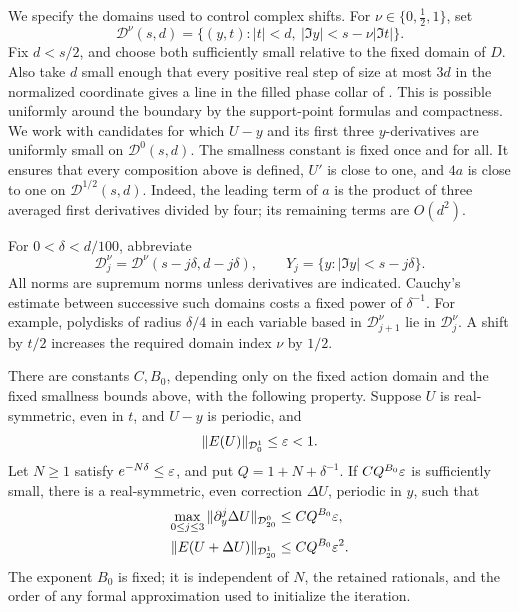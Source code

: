 We specify the domains used to control complex shifts. For
\(\nu\in\{0,\tfrac12,1\}\), set
\begin{equation}
 \mathcal D^\nu(s,d)
 =\{(y,t):|t|<d,\ |\Im y|<s-\nu|\Im t|\}.
 \label{joint:slanted-domains}
\end{equation}
Fix \(d<s/2\), and choose both sufficiently small relative to the fixed
domain of \(D\). Also take \(d\) small enough that every positive real
step of size at most \(3d\) in the normalized coordinate gives a line
in the filled phase collar of . This is
possible uniformly around the boundary by the support-point formulas
and compactness. We work with candidates for which \(U-y\) and its first
three \(y\)-derivatives are uniformly small on \(\mathcal D^0(s,d)\).
The smallness constant is fixed once and for all. It ensures that every
composition above is defined, \(U'\) is close to one, and \(4a\) is close
to one on \(\mathcal D^{1/2}(s,d)\). Indeed, the leading term of \(a\)
is the product of three averaged first derivatives divided by four;
its remaining terms are \(O(d^2)\).

For \(0<\delta<d/100\), abbreviate
\[
 \mathcal D_j^\nu=\mathcal D^\nu(s-j\delta,d-j\delta),
 \qquad Y_j=\{y:|\Im y|<s-j\delta\}.
\]
All norms are supremum norms unless derivatives are indicated. Cauchy's
estimate between successive such domains costs a fixed power of
\(\delta^{-1}\). For example, polydisks of radius \(\delta/4\) in each
variable based in \(\mathcal D_{j+1}^\nu\) lie in
\(\mathcal D_j^\nu\). A shift by \(t/2\) increases the required domain
index \(\nu\) by \(1/2\).

\begin{proposition}
\label{prop:joint-newton}
There are constants \(C,B_0\), depending only on the fixed action domain
and the fixed smallness bounds above, with the following property.
Suppose \(U\) is real-symmetric, even in \(t\), and \(U-y\) is periodic,
and
\[
 \|E(U)\|_{\mathcal D^1_0}\le\varepsilon<1.
\]
Let \(N\ge1\) satisfy \(e^{-N\delta}\le\varepsilon\), and put
\(Q=1+N+\delta^{-1}\). If \(CQ^{B_0}\varepsilon\) is sufficiently small, there
is a real-symmetric, even correction \(\Delta U\), periodic in \(y\),
such that
\begin{align}
 \max_{0\le j\le3}\|\partial_y^j\Delta U\|_{\mathcal D^0_{20}}
     &\le CQ^{B_0}\varepsilon,\label{joint:step-correction}\\
 \|E(U+\Delta U)\|_{\mathcal D^1_{20}}
     &\le CQ^{B_0}\varepsilon^2.
 \label{joint:step-error}
\end{align}
The exponent \(B_0\) is fixed; it is independent of \(N\), the retained
rationals, and the order of any formal approximation used to initialize
the iteration.
\end{proposition}

